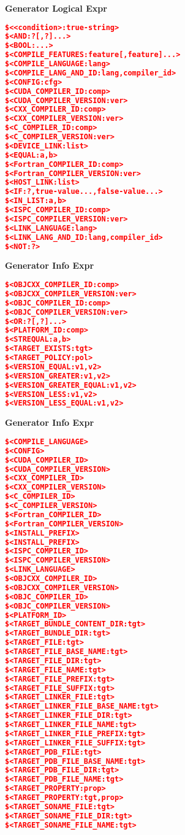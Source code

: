 \documentclass{article}
\begin{document}
\begin{minipage}[t]{0.18\linewidth}
\textbf{Generator Logical Expr}
\begin{lstlisting}[language=CMake]
$<<condition>:true-string>
$<AND:?[,?]...>
$<BOOL:...>
$<COMPILE_FEATURES:feature[,feature]...>
$<COMPILE_LANGUAGE:lang>
$<COMPILE_LANG_AND_ID:lang,compiler_id>
$<CONFIG:cfg>
$<CUDA_COMPILER_ID:comp>
$<CUDA_COMPILER_VERSION:ver>
$<CXX_COMPILER_ID:comp>
$<CXX_COMPILER_VERSION:ver>
$<C_COMPILER_ID:comp>
$<C_COMPILER_VERSION:ver>
$<DEVICE_LINK:list>
$<EQUAL:a,b>
$<Fortran_COMPILER_ID:comp>
$<Fortran_COMPILER_VERSION:ver>
$<HOST_LINK:list>
$<IF:?,true-value...,false-value...>
$<IN_LIST:a,b>
$<ISPC_COMPILER_ID:comp>
$<ISPC_COMPILER_VERSION:ver>
$<LINK_LANGUAGE:lang>
$<LINK_LANG_AND_ID:lang,compiler_id>
$<NOT:?>
\end{lstlisting}
\end{minipage}
\hfill\vline\hfill
\begin{minipage}[t]{0.18\linewidth}
\textbf{Generator Info Expr}
\begin{lstlisting}[language=CMake]
$<OBJCXX_COMPILER_ID:comp>
$<OBJCXX_COMPILER_VERSION:ver>
$<OBJC_COMPILER_ID:comp>
$<OBJC_COMPILER_VERSION:ver>
$<OR:?[,?]...>
$<PLATFORM_ID:comp>
$<STREQUAL:a,b>
$<TARGET_EXISTS:tgt>
$<TARGET_POLICY:pol>
$<VERSION_EQUAL:v1,v2>
$<VERSION_GREATER:v1,v2>
$<VERSION_GREATER_EQUAL:v1,v2>
$<VERSION_LESS:v1,v2>
$<VERSION_LESS_EQUAL:v1,v2>
\end{lstlisting}

\textbf{Generator Info Expr}
\begin{lstlisting}[language=CMake]
$<COMPILE_LANGUAGE>
$<CONFIG>
$<CUDA_COMPILER_ID>
$<CUDA_COMPILER_VERSION>
$<CXX_COMPILER_ID>
$<CXX_COMPILER_VERSION>
$<C_COMPILER_ID>
$<C_COMPILER_VERSION>
$<Fortran_COMPILER_ID>
$<Fortran_COMPILER_VERSION>
$<INSTALL_PREFIX>
$<INSTALL_PREFIX>
$<ISPC_COMPILER_ID>
$<ISPC_COMPILER_VERSION>
$<LINK_LANGUAGE>
$<OBJCXX_COMPILER_ID>
$<OBJCXX_COMPILER_VERSION>
$<OBJC_COMPILER_ID>
$<OBJC_COMPILER_VERSION>
$<PLATFORM_ID>
$<TARGET_BUNDLE_CONTENT_DIR:tgt>
$<TARGET_BUNDLE_DIR:tgt>
$<TARGET_FILE:tgt>
$<TARGET_FILE_BASE_NAME:tgt>
$<TARGET_FILE_DIR:tgt>
$<TARGET_FILE_NAME:tgt>
$<TARGET_FILE_PREFIX:tgt>
$<TARGET_FILE_SUFFIX:tgt>
$<TARGET_LINKER_FILE:tgt>
$<TARGET_LINKER_FILE_BASE_NAME:tgt>
$<TARGET_LINKER_FILE_DIR:tgt>
$<TARGET_LINKER_FILE_NAME:tgt>
$<TARGET_LINKER_FILE_PREFIX:tgt>
$<TARGET_LINKER_FILE_SUFFIX:tgt>
$<TARGET_PDB_FILE:tgt>
$<TARGET_PDB_FILE_BASE_NAME:tgt>
$<TARGET_PDB_FILE_DIR:tgt>
$<TARGET_PDB_FILE_NAME:tgt>
$<TARGET_PROPERTY:prop>
$<TARGET_PROPERTY:tgt,prop>
$<TARGET_SONAME_FILE:tgt>
$<TARGET_SONAME_FILE_DIR:tgt>
$<TARGET_SONAME_FILE_NAME:tgt>
\end{lstlisting}


\end{minipage}
\end{document}
